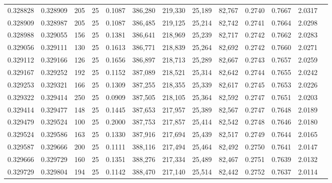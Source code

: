 \begin{tabular}{rrrrrrrrrrrrr}
0.328828 & 0.328909 &   205 &  25 &                                     0.1087 & 386,280 & 219,330 &  25,189 &  82,767 & 0.2740 & 0.7667 & 2.0317 \\
0.328909 & 0.328987 &   205 &  25 &                                     0.1087 & 386,485 & 219,125 &  25,214 &  82,742 & 0.2741 & 0.7664 & 2.0298 \\
0.328988 & 0.329055 &   156 &  25 &                                     0.1381 & 386,641 & 218,969 &  25,239 &  82,717 & 0.2742 & 0.7662 & 2.0283 \\
0.329056 & 0.329111 &   130 &  25 &                                     0.1613 & 386,771 & 218,839 &  25,264 &  82,692 & 0.2742 & 0.7660 & 2.0271 \\
0.329112 & 0.329166 &   126 &  25 &                                     0.1656 & 386,897 & 218,713 &  25,289 &  82,667 & 0.2743 & 0.7657 & 2.0259 \\
0.329167 & 0.329252 &   192 &  25 &                                     0.1152 & 387,089 & 218,521 &  25,314 &  82,642 & 0.2744 & 0.7655 & 2.0242 \\
0.329253 & 0.329321 &   166 &  25 &                                     0.1309 & 387,255 & 218,355 &  25,339 &  82,617 & 0.2745 & 0.7653 & 2.0226 \\
0.329322 & 0.329414 &   250 &  25 &                                     0.0909 & 387,505 & 218,105 &  25,364 &  82,592 & 0.2747 & 0.7651 & 2.0203 \\
0.329414 & 0.329477 &   148 &  25 &                                     0.1445 & 387,653 & 217,957 &  25,389 &  82,567 & 0.2747 & 0.7648 & 2.0189 \\
0.329479 & 0.329524 &   100 &  25 &                                     0.2000 & 387,753 & 217,857 &  25,414 &  82,542 & 0.2748 & 0.7646 & 2.0180 \\
0.329524 & 0.329586 &   163 &  25 &                                     0.1330 & 387,916 & 217,694 &  25,439 &  82,517 & 0.2749 & 0.7644 & 2.0165 \\
0.329587 & 0.329666 &   200 &  25 &                                     0.1111 & 388,116 & 217,494 &  25,464 &  82,492 & 0.2750 & 0.7641 & 2.0147 \\
0.329666 & 0.329729 &   160 &  25 &                                     0.1351 & 388,276 & 217,334 &  25,489 &  82,467 & 0.2751 & 0.7639 & 2.0132 \\
0.329729 & 0.329804 &   194 &  25 &                                     0.1142 & 388,470 & 217,140 &  25,514 &  82,442 & 0.2752 & 0.7637 & 2.0114 \\

\end{tabular}
